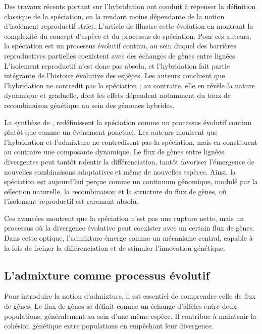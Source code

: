 \documentclass[12pt,a4paper]{article}
\begin{document}
Des travaux récents portant sur l’hybridation ont conduit à repenser la définition classique de la spéciation, en la rendant moins dépendante de la notion d’isolement reproductif strict. L’article de \textcite{schumer2018natural} illustre cette évolution en montrant la complexité du concept d’espèce et du processus de spéciation. Pour ces auteurs, la spéciation est un processus évolutif continu, au sein duquel des barrières reproductives partielles coexistent avec des échanges de gènes entre lignées.
L’isolement reproductif n’est donc pas absolu, et l’hybridation fait partie intégrante de l’histoire évolutive des espèces. Les auteurs concluent que l’hybridation ne contredit pas la spéciation ; au contraire, elle en révèle la nature dynamique et graduelle, dont les effets dépendent notamment du taux de recombinaison génétique au sein des génomes hybrides.

La synthèse de \textcite{Penalbaetal2024_HybridizationReview}, redéfinissent la spéciation comme un processus évolutif continu plutôt que comme un événement ponctuel. Les auteurs montrent que l’hybridation et l’admixture ne contredisent pas la spéciation, mais en constituent au contraire une composante dynamique. Le flux de gènes entre lignées divergentes peut tantôt ralentir la différenciation, tantôt favoriser l’émergence de nouvelles combinaisons adaptatives et même de nouvelles espèces. Ainsi, la spéciation est aujourd’hui perçue comme un continuum génomique, modulé par la sélection naturelle, la recombinaison et la structure du flux de gènes, où l’isolement reproductif est rarement absolu.

Ces avancées montrent que la spéciation n’est pas une rupture nette, mais un processus où la divergence évolutive peut coexister avec un certain flux de gènes.
Dans cette optique, l’admixture émerge comme un mécanisme central, capable à la fois de freiner la différenciation et de stimuler l’innovation génétique.
\subsection{L’admixture comme processus évolutif}

Pour introduire la notion d’admixture, il est essentiel de comprendre celle de flux de gènes.
Le flux de gènes se définit comme un échange d’allèles entre deux populations, généralement au sein d’une même espèce.
Il contribue à maintenir la cohésion génétique entre populations en empêchant leur divergence.
\end{document}
